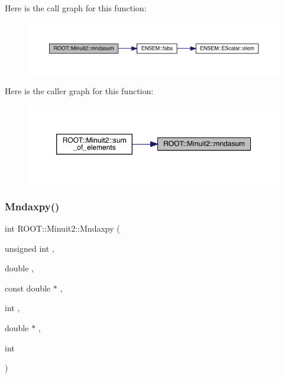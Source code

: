 Here is the call graph for this function\+:\nopagebreak
\begin{figure}[H]
\begin{center}
\leavevmode
\includegraphics[width=350pt]{d6/d3a/namespaceROOT_1_1Minuit2_a6945787dc86a55296d0de1bf1fefc508_cgraph}
\end{center}
\end{figure}
Here is the caller graph for this function\+:\nopagebreak
\begin{figure}[H]
\begin{center}
\leavevmode
\includegraphics[width=350pt]{d6/d3a/namespaceROOT_1_1Minuit2_a6945787dc86a55296d0de1bf1fefc508_icgraph}
\end{center}
\end{figure}
\mbox{\label{namespaceROOT_1_1Minuit2_a4784db8e0b280e76eb6f8b00e2b395dd}} 
\subsubsection{\texorpdfstring{Mndaxpy()}{Mndaxpy()}}
{\footnotesize\ttfamily int R\+O\+O\+T\+::\+Minuit2\+::\+Mndaxpy (\begin{DoxyParamCaption}\item[{unsigned int}]{,  }\item[{double}]{,  }\item[{const double $\ast$}]{,  }\item[{int}]{,  }\item[{double $\ast$}]{,  }\item[{int}]{ }\end{DoxyParamCaption})}

